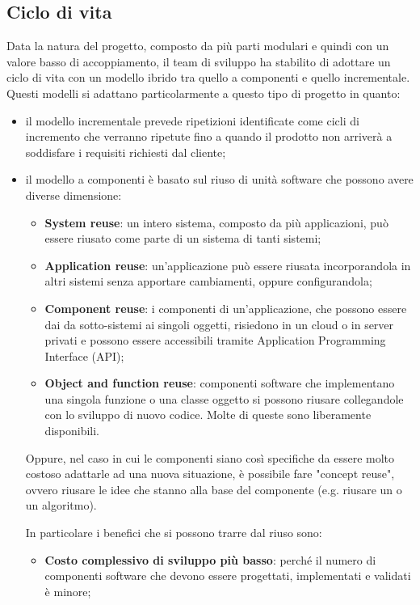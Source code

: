 	\subsection{Ciclo di vita} %
	Data la natura del progetto, composto da più parti modulari e quindi con un valore basso di accoppiamento, il team di sviluppo ha stabilito di adottare un ciclo di vita con un modello ibrido tra quello a componenti e quello incrementale.
	Questi modelli si adattano particolarmente a questo tipo di progetto in quanto:
	\begin{itemize}
		\item il modello incrementale prevede ripetizioni identificate come cicli di incremento che verranno ripetute fino a quando il prodotto non arriverà a soddisfare i requisiti richiesti dal cliente;
		\item il modello a componenti è basato sul riuso di unità software che possono avere diverse dimensione:
		\begin{itemize}
			\item \textbf{System reuse}: un intero sistema, composto da più applicazioni, può essere riusato come parte di un sistema di tanti sistemi;
			\item \textbf{Application reuse}: un'applicazione può essere riusata incorporandola in altri sistemi senza apportare cambiamenti, oppure configurandola;
			\item \textbf{Component reuse}: i componenti di un'applicazione, che possono essere dai da sotto-sistemi ai singoli oggetti, risiedono in un cloud o in server privati e possono essere accessibili tramite Application Programming Interface (API); 
			\item \textbf{Object and function reuse}: componenti software che implementano una singola funzione o una classe oggetto si possono riusare collegandole con lo sviluppo di nuovo codice. Molte di queste sono liberamente disponibili. 
		\end{itemize}
		Oppure, nel caso in cui le componenti siano così specifiche da essere molto costoso adattarle ad una nuova situazione, è possibile fare "concept reuse", ovvero riusare le idee che stanno alla base del componente (e.g. riusare un  o un algoritmo). \par
		In particolare i benefici che si possono trarre dal riuso sono:
		\begin{itemize}
			\item \textbf{Costo complessivo di sviluppo più basso}: perché il numero di componenti software che devono essere progettati, implementati e validati è minore;

\end{itemize}
\end{itemize}
